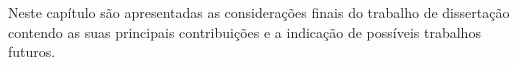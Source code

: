 Neste capítulo são apresentadas as considerações finais do trabalho de
dissertação contendo as suas principais contribuições e a indicação de possíveis
trabalhos futuros.
